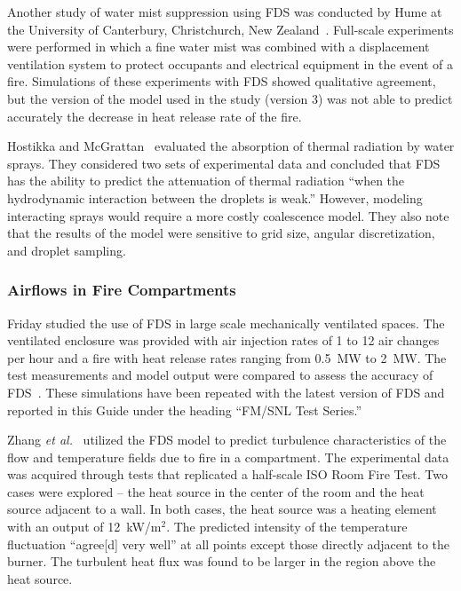 Another study  of water  mist suppression using  FDS was  conducted by Hume   at   the    University   of   Canterbury,   Christchurch,   New
Zealand~\cite{Hume:Masters}. Full-scale  experiments were performed in which a fine  water mist was combined with  a displacement ventilation system
to protect occupants and electrical equipment in the event of a fire.  Simulations of  these experiments  with FDS  showed qualitative agreement, but
the version of the  model used in the study (version 3) was not able  to predict accurately the decrease  in heat release rate of the fire.

Hostikka    and   McGrattan~\cite{Hostikka:FSJ2006}    evaluated   the absorption of  thermal radiation by water sprays.  They considered two sets of
experimental data and concluded  that FDS has  the ability to predict the  attenuation of thermal radiation  ``when the hydrodynamic interaction
between   the  droplets  is   weak.''  However,  modeling interacting sprays would require a more costly coalescence model. They also note that  the
results of the model were  sensitive to grid size, angular discretization, and droplet sampling.


\subsubsection{Airflows in Fire Compartments}

Friday studied the  use of FDS in large  scale mechanically ventilated spaces.   The ventilated  enclosure  was provided  with air  injection rates
of  1 to 12 air  changes per hour  and a fire with  heat release rates ranging  from 0.5~MW to  2~MW.  The test measurements  and model output were
compared to assess the accuracy of FDS~\cite{Friday:1}. These simulations have been repeated with the latest version of FDS and reported in this Guide under
the heading ``FM/SNL Test Series.''

Zhang {\em  et al.}~\cite{Zhang:2} utilized  the FDS model  to predict turbulence characteristics  of the flow and temperature  fields due to fire
in a compartment.   The experimental  data was  acquired through tests that replicated a half-scale ISO Room Fire Test.  Two cases were explored --
the heat  source in  the center  of the  room and  the heat source adjacent to a wall.  In both cases, the heat source was a heating element with an output of
12~kW/m$^2$.   The predicted  intensity
of  the temperature  fluctuation  ``agree[d] very well'' at  all points  except those directly  adjacent to  the burner. The turbulent heat flux was
found to be larger in the region above the heat source.


